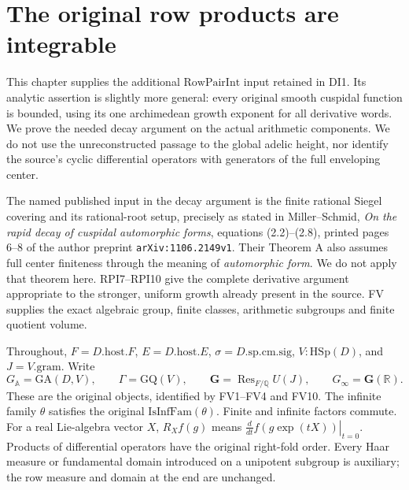 \section{The original row products are integrable}
\label{sec:row-integrability}

This chapter supplies the additional \(\mathrm{RowPairInt}\) input
retained in DI1.  Its analytic assertion is slightly more general:
every original smooth cuspidal function is bounded, using its one
archimedean growth exponent for all derivative words.  We prove the
needed decay argument on the actual arithmetic components.  We do not
use the unreconstructed passage to the global adelic height, nor
identify the source's cyclic differential operators with generators
of the full enveloping center.

The named published input in the decay argument is the finite rational
Siegel covering and its rational-root setup, precisely as stated in
Miller--Schmid, \emph{On the rapid decay of cuspidal automorphic forms},
equations (2.2)--(2.8), printed pages 6--8 of the author preprint
\texttt{arXiv:1106.2149v1}.  Their Theorem A also assumes full center
finiteness through the meaning of \emph{automorphic form}.
We do not apply that theorem here.  RPI7--RPI10 give the complete
derivative argument appropriate to the stronger, uniform growth
already present in the source.  FV supplies the exact algebraic
group, finite classes, arithmetic subgroups and finite quotient volume.

Throughout, \(F=D.\mathrm{host}.F\), \(E=D.\mathrm{host}.E\),
\(\sigma=D.\mathrm{sp.cm.sig}\), \(V:\mathrm{HSp}(D)\), and
\(J=V.\mathrm{gram}\).  Write
\[
 G_{\mathbb A}=\mathrm{GA}(D,V),\qquad
 \Gamma=\mathrm{GQ}(V),\qquad
 \mathbf G=\operatorname{Res}_{F/\mathbb Q}U(J),\qquad
 G_\infty=\mathbf G(\mathbb R).
 \tag{RPI.1}
\]
These are the original objects, identified by FV1--FV4 and FV10.
The infinite family \(\theta\) satisfies the original
\(\mathrm{IsInfFam}(\theta)\).  Finite and infinite factors commute.
For a real Lie-algebra vector \(X\), \(R_X f(g)\) means
\(\left.\frac{d}{dt}f(g\exp(tX))\right|_{t=0}\).
Products of differential operators have the original right-fold order.
Every Haar measure or fundamental domain introduced on a unipotent
subgroup is auxiliary; the row measure and domain at the end are
unchanged.

